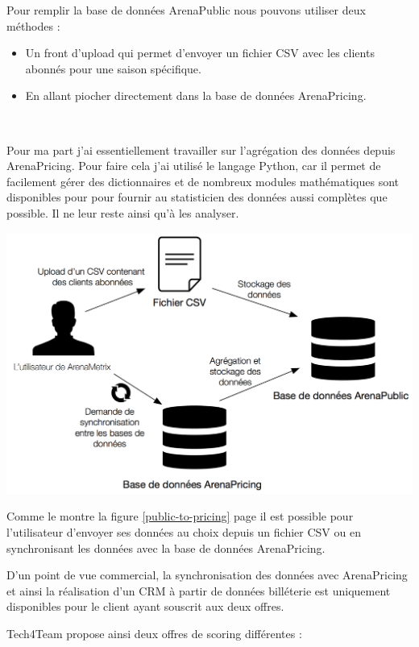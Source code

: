 Pour remplir la base de données ArenaPublic nous pouvons utiliser deux méthodes : 
\begin{itemize}
  \item[\textbullet] Un front d'upload qui permet d'envoyer un fichier CSV avec les clients abonnés pour une saison spécifique.
  \item[\textbullet] En allant piocher directement dans la base de données ArenaPricing.
  \end{itemize} \
 
Pour ma part j'ai essentiellement travailler sur l'agrégation des données depuis ArenaPricing. 
Pour faire cela j'ai utilisé le langage Python, car il permet de facilement gérer des dictionnaires et de nombreux modules mathématiques sont disponibles pour pour fournir au statisticien des données aussi complètes que possible. Il ne leur reste ainsi qu'à les analyser. 

\begin{center}
\includegraphics[scale=0.7]{images/public-to-pricing.png}
\label{public-to-pricing}
\end{center}

Comme le montre la figure \ref{public-to-pricing} page \pageref{public-to-pricing} il est possible pour l'utilisateur d'envoyer ses données au choix depuis un fichier CSV ou en synchronisant les données avec la base de données ArenaPricing. 

D'un point de vue commercial, la synchronisation des données avec ArenaPricing et ainsi la réalisation d'un CRM à partir de données billéterie est uniquement disponibles pour le client ayant souscrit aux deux offres. 

Tech4Team propose ainsi deux offres de scoring différentes : 

